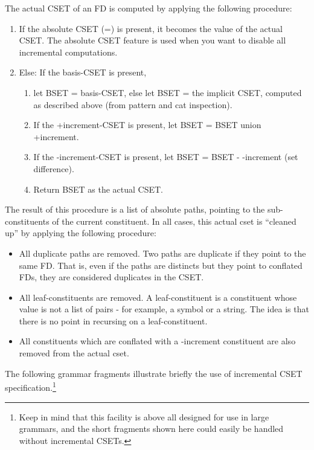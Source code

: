 \documentclass[10pt,a4paper]{report}
\begin{document}
The actual CSET of an FD is computed by applying the following procedure:
\begin{enumerate}
\item If the absolute CSET (=) is present, it becomes the value of the actual
CSET.  The absolute CSET feature is used when you want to disable all
incremental computations.

\item Else: If the basis-CSET is present, 
\begin{enumerate}
\item let BSET = basis-CSET, else let BSET = the implicit CSET, computed as
described above (from pattern and cat inspection).

\item If the +increment-CSET is present, let BSET = BSET union +increment.

\item If the -increment-CSET is present, let BSET = BSET - -increment (set
difference). 

\item Return BSET as the actual CSET.
\end{enumerate}
\end{enumerate}

The result of this procedure is a list of absolute paths, pointing to the
sub-constituents of the current constituent.  In all cases, this actual
cset is ``cleaned up'' by applying the following procedure:
\begin{itemize}
\item All duplicate paths are removed.  Two paths are duplicate if
they point to the same FD.  That is, even if the paths are distincts but
they point to conflated FDs, they are considered duplicates in the CSET.

\item All leaf-constituents are removed.  A leaf-constituent is a constituent
whose value is not a list of pairs - for example, a symbol or a string.
The idea is that there is no point in recursing on a leaf-constituent.

\item All constituents which are conflated with a -increment constituent are
also removed from the actual cset.
\end{itemize}

The following grammar fragments illustrate briefly the use of incremental
CSET specification.\footnote{Keep in mind that this facility is above all designed
for use in large grammars, and the short fragments shown here could easily
be handled without incremental CSETs.}
\end{document}
